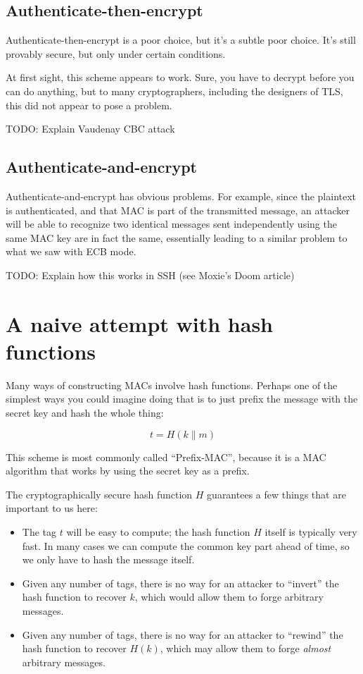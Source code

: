 \documentclass[11pt,ebook,table,dvipsnames]{memoir}
\begin{document}
\subsection{Authenticate-then-encrypt}
\label{sec-2-7-2-1}

Authenticate-then-encrypt is a poor choice, but it's a subtle poor
choice. It's still provably secure\cite{krawczyk:order}, but only
under certain conditions.

At first sight, this scheme appears to work. Sure, you have to
decrypt before you can do anything, but to many cryptographers,
including the designers of TLS, this did not appear to pose a
problem.

TODO: Explain Vaudenay CBC attack \cite{vaudenay:cbcpadding}
\subsection{Authenticate-and-encrypt}
\label{sec-2-7-2-2}

Authenticate-and-encrypt has obvious problems. For example, since the
plaintext is authenticated, and that MAC is part of the transmitted
message, an attacker will be able to recognize two identical messages
sent independently using the same MAC key are in fact the same,
essentially leading to a similar problem to what we saw with
\gls{ECB mode}.

TODO: Explain how this works in SSH (see Moxie's Doom article)

\section{A naive attempt with hash functions}
\label{sec-2-7-3}

Many ways of constructing MACs involve hash functions. Perhaps one of
the simplest ways you could imagine doing that is to just prefix the
message with the secret key and hash the whole thing:

\[
t = H(k \| m)
\]

This scheme is most commonly called \enquote{Prefix-MAC}, because it is a MAC
algorithm that works by using the secret key as a prefix.

The cryptographically secure hash function $H$ guarantees a few things
that are important to us here:

\begin{itemize}
\item The tag $t$ will be easy to compute; the hash function $H$ itself
is typically very fast. In many cases we can compute the common
key part ahead of time, so we only have to hash the message itself.
\item Given any number of tags, there is no way for an attacker to
\enquote{invert} the hash function to recover $k$, which would allow them
to forge arbitrary messages.
\item Given any number of tags, there is no way for an attacker to
\enquote{rewind} the hash function to recover $H(k)$, which may allow them
to forge \emph{almost} arbitrary messages.
\end{itemize}
\end{document}
